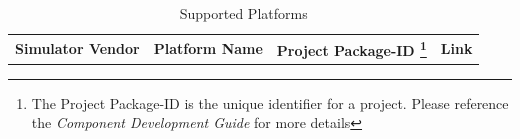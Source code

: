 	\begin{center}
		\renewcommand*\footnoterule{} %
		\renewcommand{\thempfootnote}{\arabic{mpfootnote}} %
		\begin{minipage}{1.063\textwidth}
		\begin{table}[H]
		\caption {Supported Platforms}\label{tab:plats}
		\label{table:hdlworkers} %
			\begin{tabularx}{\textwidth}{|l|l|l|p{5cm}|}
			\hline
			\rowcolor{blue}
			\textbf{Simulator Vendor} & \textbf{Platform Name} & \textbf{Project Package-ID \footnote{The Project Package-ID is the unique identifier for a project. Please reference the \textit{Component Development Guide} for more details}} & \textbf{Link}\\


\end{tabularx}
\end{table}
\end{minipage}
\end{center}

